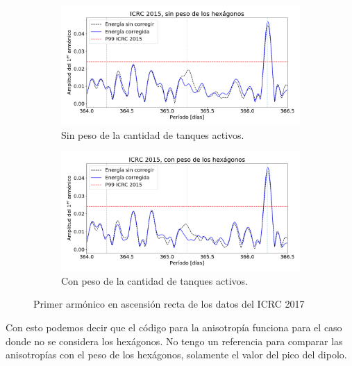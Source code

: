 				\begin{figure}[H]
				
					\begin{subfigure}[b]{\textwidth}
					\centering
						\includegraphics[width=\textwidth]{../Anisotropia/ICRC/ICRC2017_Ecor_Eraw.png}
						\caption{Sin peso de la cantidad de tanques activos. } 	\label{fig:8EeV_sin_peso_ICRC2017_raw}
					\end{subfigure}%
				
					\begin{subfigure}[b]{\textwidth}
					\centering
						\includegraphics[width=\textwidth]{../Anisotropia/ICRC/ICRC2017_Ecor_Eraw_hex.png}
						\caption{Con peso de la cantidad de tanques activos. } 	\label{fig:8EeV_sin_peso_ICRC2017_cor}
					\end{subfigure}
					\caption{Primer armónico en ascensión recta de los datos del ICRC 2017}
				\end{figure}

			Con esto podemos decir que el código para la anisotropía funciona para el caso donde no se considera los hexágonos. No tengo un referencia para comparar las anisotropías con el peso de los hexágonos, solamente el valor del pico del dipolo.

